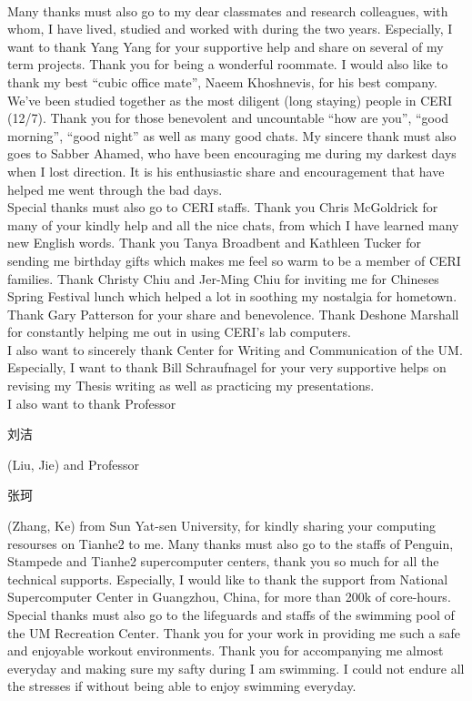 \\
Many thanks must also go to my dear classmates and research colleagues, with whom, I have lived, studied and worked with during the two years. Especially, I want to thank Yang Yang for your supportive help and share on several of my term projects. Thank you for being a wonderful roommate. I would also like to thank my best ``cubic office mate'', Naeem Khoshnevis, for his best company. We've been studied together as the most diligent (long staying) people in CERI (12/7). Thank you for those benevolent and uncountable ``how are you'', ``good morning'', ``good night'' as well as many good chats. My sincere thank must also goes to Sabber Ahamed, who have been encouraging me during my darkest days when I lost direction. It is his enthusiastic share and encouragement that have helped me went through the bad days. 
\\
Special thanks must also go to CERI staffs. Thank you Chris McGoldrick for many of your kindly help and all the nice chats, from which I have learned many new English words. Thank you Tanya Broadbent and Kathleen Tucker for sending me birthday gifts which makes me feel so warm to be a member of CERI families. Thank Christy Chiu and Jer-Ming Chiu for inviting me for Chineses Spring Festival lunch which helped a lot in soothing my nostalgia for hometown. Thank Gary Patterson for your share and benevolence. Thank Deshone Marshall for constantly helping me out in using CERI's lab computers.
\\
I also want to sincerely thank Center for Writing and Communication of the UM. Especially, I want to thank Bill Schraufnagel for your very supportive helps on revising my Thesis writing as well as practicing my presentations.
\\
I also want to thank Professor \begin{CJK}{UTF8}{gbsn}刘洁\end{CJK} (Liu, Jie) and Professor \begin{CJK}{UTF8}{gbsn}张珂\end{CJK} (Zhang, Ke) from Sun Yat-sen University, for kindly sharing your computing resourses on Tianhe2 to me. Many thanks must also go to the staffs of Penguin, Stampede and Tianhe2 supercomputer centers, thank you so much for all the technical supports. Especially, I would like to thank the support from National Supercomputer Center in Guangzhou, China, for more than 200k of core-hours. 
\\
Special thanks must also go to the lifeguards and staffs of the swimming pool of the UM Recreation Center. Thank you for your work in providing me such a safe and enjoyable workout environments. Thank you for accompanying me almost everyday and making sure my safty during I am swimming. I could not endure all the stresses if without being able to enjoy swimming everyday.  
